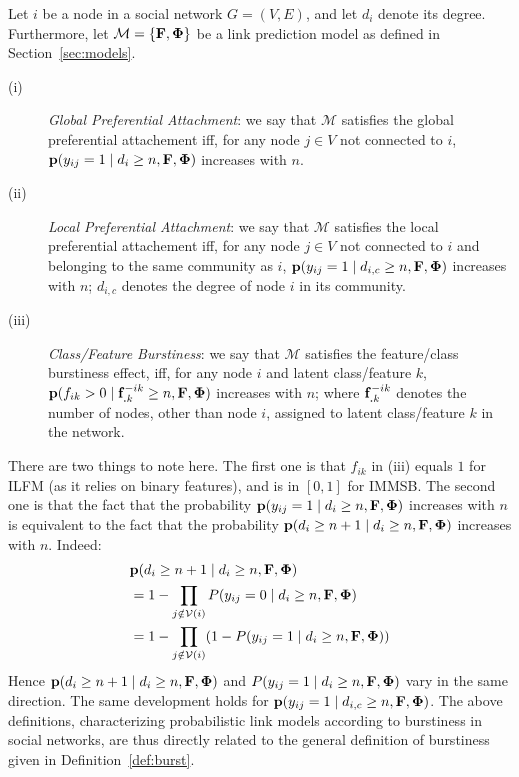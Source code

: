 \begin{definition}
Let $i$ be a node in a social network $G=(V,E)$, and let $d_i$ denote its degree. Furthermore, let $\mathcal{M}=\{\mathbf{F},\mathbf{\Phi}\}$ be a link prediction model as defined in Section~\ref{sec:models}.
\begin{description}
 \item[(i)] \emph{Global Preferential Attachment}: we say that $\mathcal{M}$ satisfies the global preferential attachement iff, for any node $j \in V$ not connected to $i$, $\mathbf{p}(y_{ij}=1 \mid d_i \ge n, \mathbf{F}, \mathbf{\Phi})$ increases with $n$.
 \item[(ii)] \emph{Local Preferential Attachment}: we say that $\mathcal{M}$ satisfies the local preferential attachement iff, for any node $j \in V$ not connected to $i$ and belonging to the same community as $i$, $\mathbf{p}(y_{ij}=1 \mid d_{i,c} \ge n, \mathbf{F}, \mathbf{\Phi})$ increases with $n$; $d_{i,c}$ denotes the degree of node $i$ in its community.
  \item[(iii)] \emph{Class/Feature Burstiness}: we say that $\mathcal{M}$ satisfies the feature/class burstiness effect, iff, for any node $i$ and latent class/feature $k$, $\mathbf{p}(f_{ik} > 0 \mid \mathbf{f}_{\bm{.}k}^{-ik} \ge n, \mathbf{F}, \mathbf{\Phi})$ increases with $n$; where $\mathbf{f}_{\bm{.}k}^{-ik}$ denotes the number of nodes, other than node $i$, assigned to latent class/feature $k$ in the network.
\end{description}
\label{def:burst-soc-net}
\end{definition}
%
There are two things to note here. The first one is that $f_{ik}$ in (iii) equals $1$ for ILFM (as it relies on binary features), and is in $[0,1]$ for IMMSB. The second one is that the fact that the probability $\mathbf{p}(y_{ij}=1 \mid d_i \ge n, \mathbf{F}, \mathbf{\Phi})$ increases with $n$ is equivalent to the fact that the probability $\mathbf{p}(d_{i} \ge n+1 \mid d_i \ge n, \mathbf{F}, \mathbf{\Phi})$ increases with $n$. Indeed:
%
\begin{align}
&\mathbf{p}(d_{i} \ge n+1 \mid d_i \ge n, \mathbf{F}, \mathbf{\Phi}) \nonumber \\
&= 1 - \prod_{j \notin \mathcal{V}(i)} P(y_{ij} = 0 \mid d_i \ge n, \mathbf{F}, \mathbf{\Phi}) \nonumber \\
&= 1 - \prod_{j \notin \mathcal{V}(i)} (1 - P(y_{ij} = 1 \mid d_i \ge n, \mathbf{F}, \mathbf{\Phi})) \nonumber
\end{align}
%
Hence $\mathbf{p}(d_{i} \ge n+1 \mid d_i \ge n, \mathbf{F}, \mathbf{\Phi})$ and $P(y_{ij} = 1 \mid d_i \ge n, \mathbf{F}, \mathbf{\Phi})$ vary in the same direction. The same development holds for $\mathbf{p}(y_{ij}=1 \mid d_{i,c} \ge n, \mathbf{F}, \mathbf{\Phi})$. The above definitions, characterizing probabilistic link models according to burstiness in social networks, are thus directly related to the general definition of burstiness given in Definition~\ref{def:burst}.

